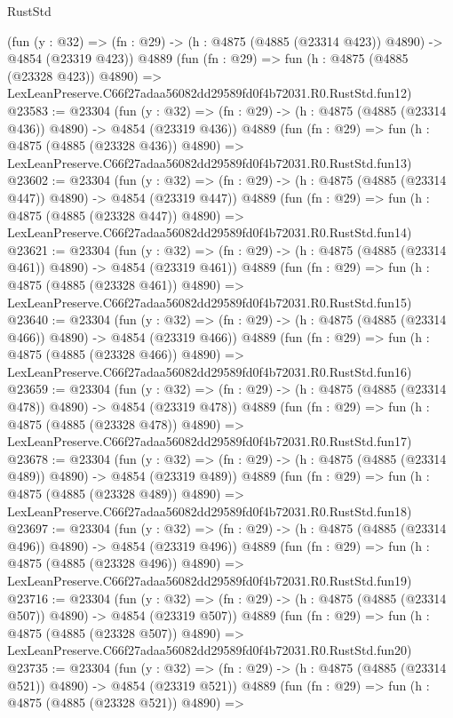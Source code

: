\begin{lexlean}{RustStd}
\begin{coremodule}
    (fun (y : @32) => (fn : @29) -> (h : @4875 (@4885 (@23314 @423)) @4890) -> @4854 (@23319 @423))
    @4889
    (fun (fn : @29) =>
    fun (h : @4875 (@4885 (@23328 @423)) @4890) =>
    LexLeanPreserve.C66f27adaa56082dd29589fd0f4b72031.R0.RustStd.fun12)
@23583 := @23304
    (fun (y : @32) => (fn : @29) -> (h : @4875 (@4885 (@23314 @436)) @4890) -> @4854 (@23319 @436))
    @4889
    (fun (fn : @29) =>
    fun (h : @4875 (@4885 (@23328 @436)) @4890) =>
    LexLeanPreserve.C66f27adaa56082dd29589fd0f4b72031.R0.RustStd.fun13)
@23602 := @23304
    (fun (y : @32) => (fn : @29) -> (h : @4875 (@4885 (@23314 @447)) @4890) -> @4854 (@23319 @447))
    @4889
    (fun (fn : @29) =>
    fun (h : @4875 (@4885 (@23328 @447)) @4890) =>
    LexLeanPreserve.C66f27adaa56082dd29589fd0f4b72031.R0.RustStd.fun14)
@23621 := @23304
    (fun (y : @32) => (fn : @29) -> (h : @4875 (@4885 (@23314 @461)) @4890) -> @4854 (@23319 @461))
    @4889
    (fun (fn : @29) =>
    fun (h : @4875 (@4885 (@23328 @461)) @4890) =>
    LexLeanPreserve.C66f27adaa56082dd29589fd0f4b72031.R0.RustStd.fun15)
@23640 := @23304
    (fun (y : @32) => (fn : @29) -> (h : @4875 (@4885 (@23314 @466)) @4890) -> @4854 (@23319 @466))
    @4889
    (fun (fn : @29) =>
    fun (h : @4875 (@4885 (@23328 @466)) @4890) =>
    LexLeanPreserve.C66f27adaa56082dd29589fd0f4b72031.R0.RustStd.fun16)
@23659 := @23304
    (fun (y : @32) => (fn : @29) -> (h : @4875 (@4885 (@23314 @478)) @4890) -> @4854 (@23319 @478))
    @4889
    (fun (fn : @29) =>
    fun (h : @4875 (@4885 (@23328 @478)) @4890) =>
    LexLeanPreserve.C66f27adaa56082dd29589fd0f4b72031.R0.RustStd.fun17)
@23678 := @23304
    (fun (y : @32) => (fn : @29) -> (h : @4875 (@4885 (@23314 @489)) @4890) -> @4854 (@23319 @489))
    @4889
    (fun (fn : @29) =>
    fun (h : @4875 (@4885 (@23328 @489)) @4890) =>
    LexLeanPreserve.C66f27adaa56082dd29589fd0f4b72031.R0.RustStd.fun18)
@23697 := @23304
    (fun (y : @32) => (fn : @29) -> (h : @4875 (@4885 (@23314 @496)) @4890) -> @4854 (@23319 @496))
    @4889
    (fun (fn : @29) =>
    fun (h : @4875 (@4885 (@23328 @496)) @4890) =>
    LexLeanPreserve.C66f27adaa56082dd29589fd0f4b72031.R0.RustStd.fun19)
@23716 := @23304
    (fun (y : @32) => (fn : @29) -> (h : @4875 (@4885 (@23314 @507)) @4890) -> @4854 (@23319 @507))
    @4889
    (fun (fn : @29) =>
    fun (h : @4875 (@4885 (@23328 @507)) @4890) =>
    LexLeanPreserve.C66f27adaa56082dd29589fd0f4b72031.R0.RustStd.fun20)
@23735 := @23304
    (fun (y : @32) => (fn : @29) -> (h : @4875 (@4885 (@23314 @521)) @4890) -> @4854 (@23319 @521))
    @4889
    (fun (fn : @29) =>
    fun (h : @4875 (@4885 (@23328 @521)) @4890) =>

\end{coremodule}
\end{lexlean}
